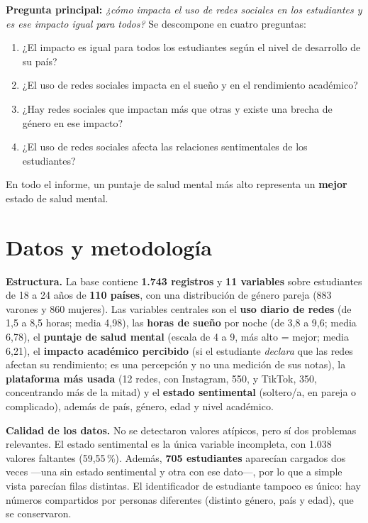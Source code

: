 \documentclass[10pt,a4paper]{article}
\begin{document}
\begin{hallazgo}
\textbf{Pregunta principal:} \textit{¿cómo impacta el uso de redes sociales en los estudiantes y es ese
impacto igual para todos?} Se descompone en cuatro preguntas:
\begin{enumerate}[label=\arabic*.,itemsep=0pt,topsep=2pt]
  \item ¿El impacto es igual para todos los estudiantes según el nivel de desarrollo de su país?
  \item ¿El uso de redes sociales impacta en el sueño y en el rendimiento académico?
  \item ¿Hay redes sociales que impactan más que otras y existe una brecha de género en ese impacto?
  \item ¿El uso de redes sociales afecta las relaciones sentimentales de los estudiantes?
\end{enumerate}
\end{hallazgo}

En todo el informe, un puntaje de salud mental más alto representa un \textbf{mejor} estado de salud mental.

\section{Datos y metodología}

\textbf{Estructura.} La base contiene \textbf{1.743 registros} y \textbf{11 variables} sobre estudiantes de
18 a 24 años de \textbf{110 países}, con una distribución de género pareja (883 varones y 860 mujeres). Las
variables centrales son el \textbf{uso diario de redes} (de 1,5 a 8,5 horas; media 4,98), las \textbf{horas
de sueño} por noche (de 3,8 a 9,6; media 6,78), el \textbf{puntaje de salud mental} (escala de 4 a 9, más
alto = mejor; media 6,21), el \textbf{impacto académico percibido} (si el estudiante \emph{declara} que las
redes afectan su rendimiento; es una percepción y no una medición de sus notas), la \textbf{plataforma más
usada} (12 redes, con Instagram, 550, y TikTok, 350, concentrando más de la mitad) y el \textbf{estado
sentimental} (soltero/a, en pareja o complicado), además de país, género, edad y nivel académico.

\textbf{Calidad de los datos.} No se detectaron valores atípicos, pero sí dos problemas relevantes. El
estado sentimental es la única variable incompleta, con 1.038 valores faltantes (59,55\,\%). Además,
\textbf{705 estudiantes} aparecían cargados dos veces —una sin estado sentimental y otra con ese dato—,
por lo que a simple vista parecían filas distintas. El identificador de estudiante tampoco es único: hay
números compartidos por personas diferentes (distinto género, país y edad), que se conservaron.
\end{document}
